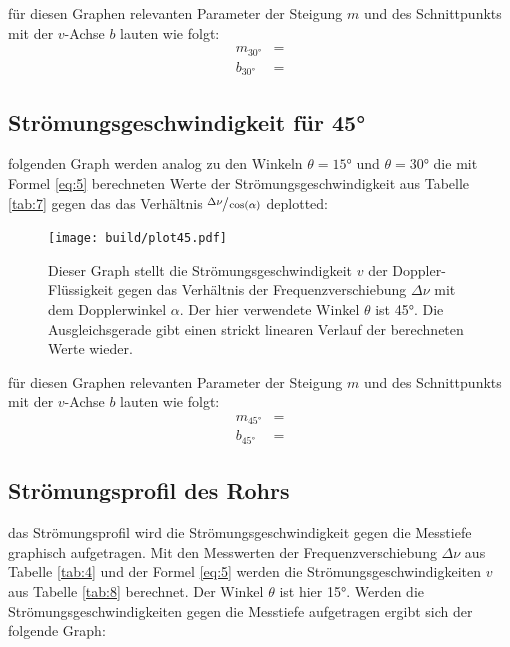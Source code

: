     \justifying für diesen Graphen relevanten Parameter der Steigung $m$ und des Schnittpunkts mit der $v$-Achse $b$ lauten wie folgt:
    \begin{align}
        m_{30°} &= \text{} \label{eq:8}\\
        b_{30°} &= \text{} \label{eq:9}
    \end{align}

\newpage
\subsection{Strömungsgeschwindigkeit für 45°}

    \justifying folgenden Graph werden analog zu den Winkeln $\theta=15°$ und $\theta=30°$ die mit Formel \eqref{eq:5} berechneten Werte der Strömungsgeschwindigkeit 
    aus Tabelle \ref{tab:7} gegen das das Verhältnis $\sfrac{\Delta\nu}{\cos(\alpha)}$ deplotted:

\begin{figure}[H]
    \centering
    \texttt{[image: build/plot45.pdf]}
    \caption{Dieser Graph stellt die Strömungsgeschwindigkeit $v$ der Doppler-Flüssigkeit gegen das Verhältnis der Frequenzverschiebung $\Delta\nu$ mit dem Dopplerwinkel $\alpha$. 
    Der hier verwendete Winkel $\theta$ ist 45°. Die Ausgleichsgerade gibt einen strickt linearen Verlauf der berechneten Werte wieder.}
    \label{fig:7}
\end{figure}

    \justifying für diesen Graphen relevanten Parameter der Steigung $m$ und des Schnittpunkts mit der $v$-Achse $b$ lauten wie folgt:
    \begin{align}
        m_{45°} &= \text{} \label{eq:10}\\
        b_{45°} &= \text{} \label{eq:11}
    \end{align}

\newpage
\subsection{Strömungsprofil des Rohrs}

    \justifying das Strömungsprofil wird die Strömungsgeschwindigkeit gegen die Messtiefe graphisch aufgetragen. Mit den Messwerten der Frequenzverschiebung
    $\Delta\nu$ aus Tabelle \ref{tab:4} und der Formel \eqref{eq:5} werden die Strömungsgeschwindigkeiten $v$ aus Tabelle \ref{tab:8} berechnet. Der Winkel $\theta$ ist hier
    15°. Werden die Strömungsgeschwindigkeiten gegen die Messtiefe aufgetragen ergibt sich der folgende Graph:

